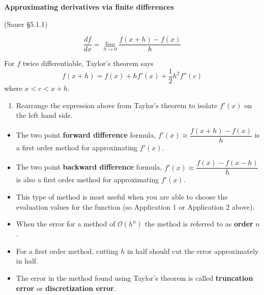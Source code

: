 \documentclass[12pt,letterpaper,noanswers]{exam}
\begin{document}
\noindent\textbf{Approximating derivatives via finite differences}
\begin{tcolorbox}

(Sauer \S 5.1.1)

\[\frac{df}{dx} = \lim\limits_{h\rightarrow 0} \frac{f(x+h)-f(x)}{h}\]

For $f$ twice differentiable, Taylor's theorem says
\[f(x+h) = f(x) + hf'(x) + \frac{1}{2}h^2 f''(c)\] where $x< c< x+h$.
\end{tcolorbox}
\begin{enumerate}[resume=classQ]
\item Rearrange the expression above from Taylor's theorem to isolate $f'(x)$ on the left hand side.
\vspace{1in}

\end{enumerate}

\begin{tcolorbox}
\begin{itemize}
\itemsep0pt
    \item The two point \textbf{forward difference} formula, $f'(x)\approx \dfrac{f(x+h)-f(x)}{h}$ is a first order method for approximating $f'(x)$.
    \item The two point \textbf{backward difference} formula, $f'(x)\approx \dfrac{f(x)-f(x-h)}{h}$ is also a first order method for approximating $f'(x)$.
    \item This type of method is most useful when you are able to choose the evaluation values for the function (so Application 1 or Application 2 above).
    \item When the error for a method of $\mathcal{O}(h^n)$ the method is referred to as \textbf{order} $n$.
    \item For a first order method, cutting $h$ in half should cut the error approximately in half.
    \item The error in the method found using Taylor's theorem is called \textbf{truncation error} or \textbf{discretization error}.
\end{itemize}
\end{tcolorbox}
\end{document}
